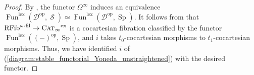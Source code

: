 \documentclass{article}
\DeclareMathOperator{\CAT}{C\normalfont\textsc{at}_\infty} %
\DeclareMathOperator{\Fun}{Fun} %
\DeclareMathOperator{\Spectra}{Sp} %
\DeclareMathOperator{\Spaces}{\mathcal{S}} %
\newcommand{\op}{\mathrm{op}}
\theoremstyle{definition}
\newcommand{\Lucy}[1]{\todo[color=cyan!30]{\footnotesize L: #1}}
\begin{document}
\begin{proof}
    By \cite[Corollary 1.4.2.23]{LurHA}, the functor $ \Omega^\infty $ induces an equivalence $ \Fun^{\mathrm{lex}}\left(\mathcal{D}^\op,\Spaces\right) \simeq \Fun^{\mathrm{lex}}\left(\mathcal{D}^\op,\Spectra\right) $.  
    It follows from \cite[Lemma 1.4.1(i)]{CDHHLMNNSI} that $ \mathrm{RFib}^{\omega\text{-fil}} \to \CAT^{\mathrm{ex}} $ is a cocartesian fibration classified by the functor $ \Fun^{\mathrm{lex}}\left((-)^\op,\Spectra\right) $, and $ i $ takes $ t_0 $-cocartesian morphisms to $ t_1 $-cocartesian morphisms.     
    Thus, we have identified $ i $ of (\ref{diagram:stable_functorial_Yoneda_unstraightened}) with the desired functor.  
\end{proof}
\end{document}
